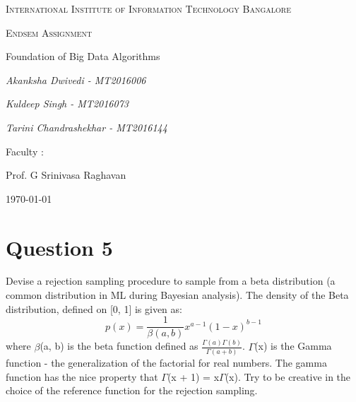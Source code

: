 \documentclass[12pt,a4paper]{article}
\begin{document}
\begin{titlepage}
	\centering
	{\scshape\LARGE International Institute of Information Technology Bangalore \par}
	\vspace{1cm}
	{\scshape\Large Endsem Assignment\par}
	{\Large Foundation of Big Data Algorithms\par}
	\vspace{1.5cm}
	{\Large\itshape Akanksha Dwivedi - MT2016006\par}
	{\Large\itshape Kuldeep Singh - MT2016073\par}
	{\Large\itshape Tarini Chandrashekhar - MT2016144\par}
	\vfill
	
	Faculty : \par
	Prof. G Srinivasa Raghavan

	\vfill

	{\large \today\par}
\end{titlepage}


\tableofcontents
\newpage
\section{Question 5}
Devise a rejection sampling procedure to sample from a beta distribution (a common distribution in ML during Bayesian analysis). The density of the Beta distribution, defined on [0, 1] is given as:
\begin{equation*}
    p(x) = \frac{1}{\beta(a,b)}x^{a-1}(1-x)^{b-1}
\end{equation*}
where $\beta$(a, b) is the beta function defined as $\frac{\Gamma(a)\Gamma(b)}{\Gamma(a+b)}$. $\Gamma$(x) is the Gamma function - the generalization of the factorial for real numbers. The gamma function has the nice property that $\Gamma$(x + 1) = x$\Gamma$(x). Try to be creative in the choice of the reference function for the rejection sampling.
\end{document}
